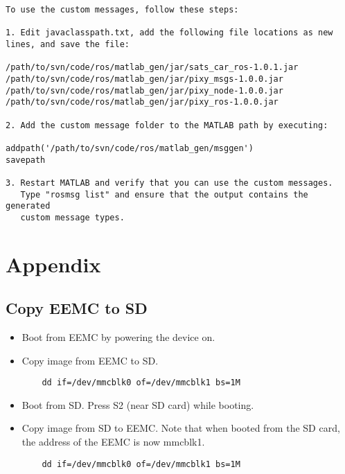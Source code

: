 \documentclass{article}
\begin{document}
\begin{lstlisting}[label={matlab},caption={method for using custom messages in matlab}]
To use the custom messages, follow these steps:
 
1. Edit javaclasspath.txt, add the following file locations as new lines, and save the file:
 
/path/to/svn/code/ros/matlab_gen/jar/sats_car_ros-1.0.1.jar
/path/to/svn/code/ros/matlab_gen/jar/pixy_msgs-1.0.0.jar
/path/to/svn/code/ros/matlab_gen/jar/pixy_node-1.0.0.jar
/path/to/svn/code/ros/matlab_gen/jar/pixy_ros-1.0.0.jar
 
2. Add the custom message folder to the MATLAB path by executing:
 
addpath('/path/to/svn/code/ros/matlab_gen/msggen')
savepath
 
3. Restart MATLAB and verify that you can use the custom messages. 
   Type "rosmsg list" and ensure that the output contains the generated
   custom message types.
\end{lstlisting}

\section{Appendix}
\subsection{Copy EEMC to SD}
\begin{itemize}
    \item Boot from EEMC by powering the device on.
    \item Copy image from EEMC to SD.
    \begin{lstlisting}
    dd if=/dev/mmcblk0 of=/dev/mmcblk1 bs=1M
    \end{lstlisting}
    \item Boot from SD. Press S2 (near SD card) while booting. 
    \item Copy image from SD to EEMC. Note that when booted from the SD card, the address of the EEMC is now mmcblk1. 
    \begin{lstlisting}
    dd if=/dev/mmcblk0 of=/dev/mmcblk1 bs=1M
    \end{lstlisting}
\end{itemize}
\end{document}
